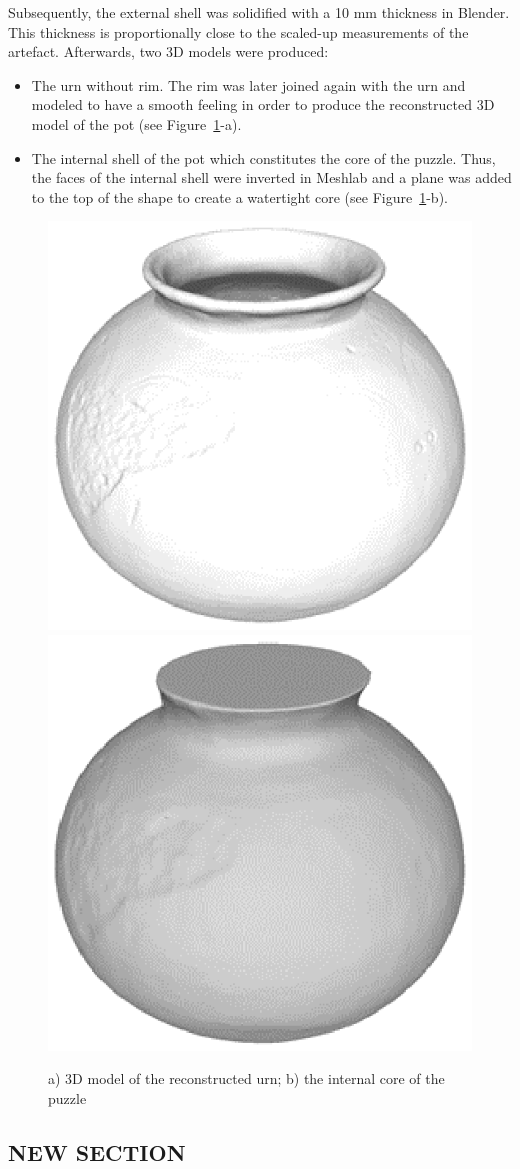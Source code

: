 \documentclass[acmlarge,screen,dvipsnames]{acmart}
\begin{document}
Subsequently, the external shell was solidified with a 10 mm thickness
in Blender. This thickness is proportionally close to the scaled-up
measurements of the artefact. Afterwards, two 3D models were produced:
%
\begin{itemize}
\item The urn without rim. The rim was later joined again with the urn
  and modeled to have a smooth feeling in order to produce the
  reconstructed 3D model of the pot (see
  Figure~\ref{fig:reconstruction}-a).
\item The internal shell of the pot which constitutes the core of the
  puzzle. Thus, the faces of the internal shell were inverted in
  Meshlab and a plane was added to the top of the shape to create a
  watertight core (see Figure~\ref{fig:reconstruction}-b).
\end{itemize}

\begin{figure}[h]
  \centering
  \includegraphics[width=0.45\linewidth]{images/3Dreconstruction}
  \includegraphics[width=0.45\linewidth]{images/core}
  \caption{\label{fig:reconstruction}%
    a) 3D model of the reconstructed urn; b) the internal core of the puzzle}
\end{figure}

\greenBegin

\subsection{NEW SECTION}
\end{document}
